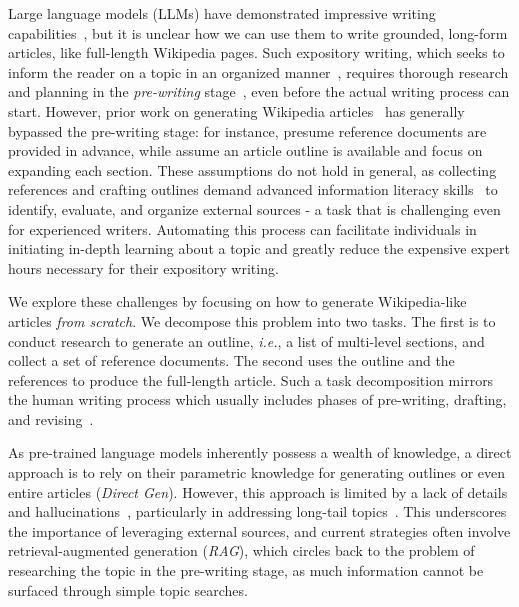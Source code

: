 \documentclass[11pt]{article}
\def\ie{\textit{i.e.}\xspace}
\begin{document}
Large language models (LLMs) have demonstrated impressive writing capabilities~\citep{yang-etal-2023-doc, pavlik2023collaborating,wenzlaff2022smarter,fitria2023artificial}, but it is unclear how we can use them to write grounded, long-form articles, like full-length Wikipedia pages. Such expository writing, which seeks to inform the reader on a topic in an organized manner~\citep{weaver1991expository, balepur-etal-2023-expository}, requires thorough research and planning in the \textit{pre-writing} stage~\citep{rohman1965pre}, even before the actual writing process can start.
However, prior work on generating Wikipedia articles~\citep{banerjee-mitra-2015-wikikreator,minguillon2017semi,j.2018generating,fan-gardent-2022-generating} has generally bypassed the pre-writing stage: for instance, \citet{j.2018generating} presume reference documents are provided in advance, while \citet{fan-gardent-2022-generating} assume an article outline is available and focus on expanding each section. These assumptions do not hold in general, as collecting references and crafting outlines demand advanced information literacy skills~\citep{doyle1994information} to identify, evaluate, and organize external sources - a task that is challenging even for experienced writers. Automating this process can facilitate individuals in initiating in-depth learning about a topic and greatly reduce the expensive expert hours necessary for their expository writing.





We explore these challenges by focusing on how to generate Wikipedia-like articles \textit{from scratch}. %
We decompose this problem into two tasks. The first is to conduct research to generate an outline, \ie, a list of multi-level sections, and collect a set of reference documents. The second uses the outline and the references to produce the full-length article. Such a task decomposition mirrors the human writing process which usually includes phases of pre-writing, drafting, and revising~\citep{rohman1965pre,munoz2015main}.





As pre-trained language models inherently possess a wealth of knowledge, a direct approach is to rely on their parametric knowledge for generating outlines or even entire articles (\textit{Direct Gen}). However, this approach is limited by a lack of details and hallucinations~\citep{xu-etal-2023-critical}, particularly in addressing long-tail topics~\cite{kandpal2023large}. This underscores the importance of leveraging external sources, and current strategies often involve retrieval-augmented generation (\textit{RAG}), which circles back to the problem of researching the topic in the pre-writing stage, as much information cannot be surfaced through simple topic searches.
\end{document}
